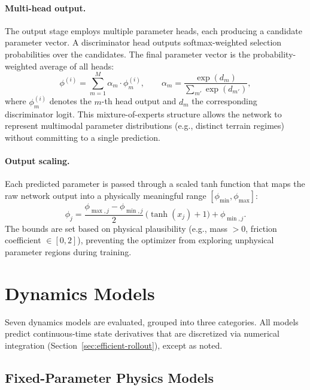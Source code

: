 \paragraph{Multi-head output.}
The output stage employs multiple parameter heads, each producing a candidate parameter vector. A discriminator head outputs softmax-weighted selection probabilities over the candidates. The final parameter vector is the probability-weighted average of all heads:
\begin{equation}
  \phi^{(i)} = \sum_{m=1}^{M} \alpha_m \cdot \phi^{(i)}_m, \qquad \alpha_m = \frac{\exp(d_m)}{\sum_{m'}\exp(d_{m'})},
\end{equation}
where $\phi^{(i)}_m$ denotes the $m$-th head output and $d_m$ the corresponding discriminator logit. This mixture-of-experts structure allows the network to represent multimodal parameter distributions (e.g., distinct terrain regimes) without committing to a single prediction.

\paragraph{Output scaling.}
Each predicted parameter is passed through a scaled tanh function that maps the raw network output into a physically meaningful range $[\phi_{\min}, \phi_{\max}]$:
\begin{equation}
  \phi_j = \frac{\phi_{\max,j} - \phi_{\min,j}}{2}\,\big(\tanh(x_j) + 1\big) + \phi_{\min,j}.
\end{equation}
The bounds are set based on physical plausibility (e.g., mass $> 0$, friction coefficient $\in [0, 2]$), preventing the optimizer from exploring unphysical parameter regions during training.

\section{Dynamics Models}
\label{sec:dynamics-models}

Seven dynamics models are evaluated, grouped into three categories. All models predict continuous-time state derivatives that are discretized via numerical integration (Section~\ref{sec:efficient-rollout}), except as noted.

\subsection{Fixed-Parameter Physics Models}
\label{sec:fixed}


